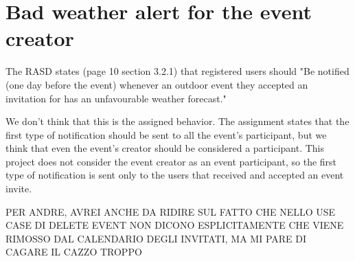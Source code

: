 \documentclass[10pt,a4paper,titlepage]{article}
\begin{document}
\section{Bad weather alert for the event creator}
The RASD states (page 10 section 3.2.1) that registered users should "Be notified (one day before the event) whenever an outdoor event they accepted an invitation for has an unfavourable weather forecast."

We don't think that this is the assigned behavior. The assignment states that the first type of notification should be sent to all the event's participant, but we think that even the event's creator should be considered a participant. This project does not consider the event creator as an event participant, so the first type of notification is sent only to the users that received and accepted an event invite.


PER ANDRE, AVREI ANCHE DA RIDIRE SUL FATTO CHE NELLO USE CASE DI DELETE EVENT NON DICONO ESPLICITAMENTE CHE VIENE RIMOSSO DAL CALENDARIO DEGLI INVITATI, MA MI PARE DI CAGARE IL CAZZO TROPPO
\end{document}
